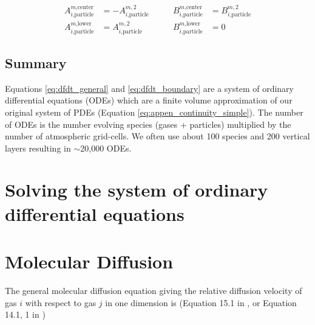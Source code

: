 \begin{equation*}
  \begin{aligned}
  A_{i\text{,particle}}^{m\text{,center}} &= - A_{i\text{,particle}}^{m,2} \\
  A_{i\text{,particle}}^{m\text{,lower}} &= A_{i\text{,particle}}^{m,2}
  \end{aligned}
  \quad\quad
  \begin{aligned}
  B_{i\text{,particle}}^{m\text{,center}} &= B_{i\text{,particle}}^{m,2} \\
  B_{i\text{,particle}}^{m\text{,lower}} &= 0
  \end{aligned}
\end{equation*}

\subsection{Summary}

Equations \eqref{eq:dfdt_general} and \eqref{eq:dfdt_boundary} are a system of ordinary differential equations (ODEs) which are a finite volume approximation of our original system of PDEs (Equation \eqref{eq:appen_continuity_simple}). The number of ODEs is the number evolving species (gases + particles) multiplied by the number of atmospheric grid-cells. We often use about 100 species and 200 vertical layers resulting in $\sim$20,000 ODEs.

\section{Solving the system of ordinary differential equations}



\section{Molecular Diffusion} \label{sec:molecular_diffusion}

The general molecular diffusion equation giving the relative diffusion velocity of gas $i$ with respect to gas $j$ in one dimension is (Equation 15.1 in \citet{Banks_2013}, or Equation 14.1, 1 in \citet{Chapman_1990})

